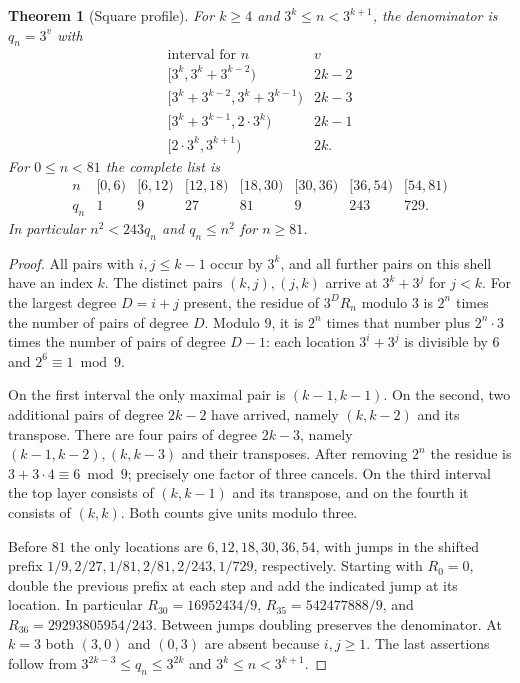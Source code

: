 \documentclass[11pt]{article}
\newtheorem{theorem}{Theorem}
\begin{document}
\begin{theorem}[Square profile]\label{thm:square}
For $k\ge4$ and $3^k\le n<3^{k+1}$, the denominator is $q_n=3^v$ with
\[
\begin{array}{c|c}
 \text{interval for }n & v\\ \hline
 {}[3^k,3^k+3^{k-2})&2k-2\\
 {}[3^k+3^{k-2},3^k+3^{k-1})&2k-3\\
 {}[3^k+3^{k-1},2\cdot3^k)&2k-1\\
 {}[2\cdot3^k,3^{k+1})&2k .
\end{array}
\]
For $0\le n<81$ the complete list is
\[
\begin{array}{c|rrrrrrr}
 n &[0,6)&[6,12)&[12,18)&[18,30)&[30,36)&[36,54)&[54,81)\\ \hline
 q_n&1&9&27&81&9&243&729 .
\end{array}
\]
In particular $n^2<243q_n$ and $q_n\le n^2$ for $n\ge81$.
\end{theorem}
\begin{proof}
All pairs with $i,j\le k-1$ occur by $3^k$, and all further pairs on this shell
have an index $k$. The distinct pairs $(k,j),(j,k)$ arrive at $3^k+3^j$ for $j<k$.
For the largest degree $D=i+j$ present, the residue of $3^D R_n$ modulo $3$ is
$2^n$ times the number of pairs of degree $D$. Modulo $9$, it is $2^n$ times
that number plus $2^n\cdot3$ times the number of pairs of degree $D-1$:
each location $3^i+3^j$ is divisible by $6$ and $2^6\equiv1\bmod9$.

On the first interval the only maximal pair is $(k-1,k-1)$. On the second,
two additional pairs of degree $2k-2$ have arrived, namely $(k,k-2)$ and its transpose.
There are four pairs of degree $2k-3$, namely $(k-1,k-2),(k,k-3)$ and their transposes.
After removing $2^n$ the residue is $3+3\cdot4\equiv6\bmod9$; precisely one factor
of three cancels. On the third interval the top layer consists of $(k,k-1)$ and
its transpose, and on the fourth it consists of $(k,k)$. Both counts give units
modulo three.

Before $81$ the only locations are $6,12,18,30,36,54$, with jumps in the shifted prefix
$1/9,2/27,1/81,2/81,2/243,1/729$, respectively. Starting with $R_0=0$, double
the previous prefix at each step and add the indicated jump at its location.
In particular $R_{30}=16952434/9$, $R_{35}=542477888/9$, and
$R_{36}=29293805954/243$. Between jumps doubling preserves the denominator.
At $k=3$ both $(3,0)$ and $(0,3)$ are absent because $i,j\ge1$.
The last assertions follow from $3^{2k-3}\le q_n\le3^{2k}$ and
$3^k\le n<3^{k+1}$.
\end{proof}
\end{document}
